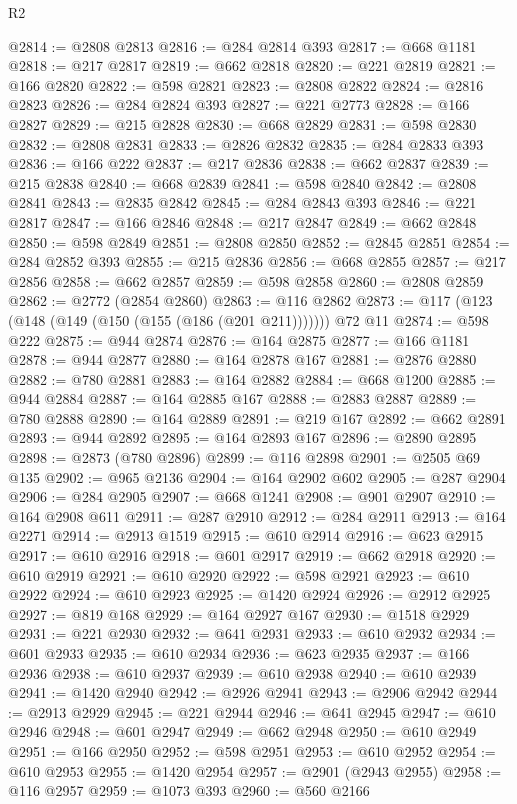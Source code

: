 \begin{lexlean}{R2}
\begin{coremodule}
@2814 := @2808 @2813
@2816 := @284 @2814 @393
@2817 := @668 @1181
@2818 := @217 @2817
@2819 := @662 @2818
@2820 := @221 @2819
@2821 := @166 @2820
@2822 := @598 @2821
@2823 := @2808 @2822
@2824 := @2816 @2823
@2826 := @284 @2824 @393
@2827 := @221 @2773
@2828 := @166 @2827
@2829 := @215 @2828
@2830 := @668 @2829
@2831 := @598 @2830
@2832 := @2808 @2831
@2833 := @2826 @2832
@2835 := @284 @2833 @393
@2836 := @166 @222
@2837 := @217 @2836
@2838 := @662 @2837
@2839 := @215 @2838
@2840 := @668 @2839
@2841 := @598 @2840
@2842 := @2808 @2841
@2843 := @2835 @2842
@2845 := @284 @2843 @393
@2846 := @221 @2817
@2847 := @166 @2846
@2848 := @217 @2847
@2849 := @662 @2848
@2850 := @598 @2849
@2851 := @2808 @2850
@2852 := @2845 @2851
@2854 := @284 @2852 @393
@2855 := @215 @2836
@2856 := @668 @2855
@2857 := @217 @2856
@2858 := @662 @2857
@2859 := @598 @2858
@2860 := @2808 @2859
@2862 := @2772 (@2854 @2860)
@2863 := @116 @2862
@2873 := @117 (@123 (@148 (@149 (@150 (@155 (@186 (@201 @211))))))) @72 @11
@2874 := @598 @222
@2875 := @944 @2874
@2876 := @164 @2875
@2877 := @166 @1181
@2878 := @944 @2877
@2880 := @164 @2878 @167
@2881 := @2876 @2880
@2882 := @780 @2881
@2883 := @164 @2882
@2884 := @668 @1200
@2885 := @944 @2884
@2887 := @164 @2885 @167
@2888 := @2883 @2887
@2889 := @780 @2888
@2890 := @164 @2889
@2891 := @219 @167
@2892 := @662 @2891
@2893 := @944 @2892
@2895 := @164 @2893 @167
@2896 := @2890 @2895
@2898 := @2873 (@780 @2896)
@2899 := @116 @2898
@2901 := @2505 @69 @135
@2902 := @965 @2136
@2904 := @164 @2902 @602
@2905 := @287 @2904
@2906 := @284 @2905
@2907 := @668 @1241
@2908 := @901 @2907
@2910 := @164 @2908 @611
@2911 := @287 @2910
@2912 := @284 @2911
@2913 := @164 @2271
@2914 := @2913 @1519
@2915 := @610 @2914
@2916 := @623 @2915
@2917 := @610 @2916
@2918 := @601 @2917
@2919 := @662 @2918
@2920 := @610 @2919
@2921 := @610 @2920
@2922 := @598 @2921
@2923 := @610 @2922
@2924 := @610 @2923
@2925 := @1420 @2924
@2926 := @2912 @2925
@2927 := @819 @168
@2929 := @164 @2927 @167
@2930 := @1518 @2929
@2931 := @221 @2930
@2932 := @641 @2931
@2933 := @610 @2932
@2934 := @601 @2933
@2935 := @610 @2934
@2936 := @623 @2935
@2937 := @166 @2936
@2938 := @610 @2937
@2939 := @610 @2938
@2940 := @610 @2939
@2941 := @1420 @2940
@2942 := @2926 @2941
@2943 := @2906 @2942
@2944 := @2913 @2929
@2945 := @221 @2944
@2946 := @641 @2945
@2947 := @610 @2946
@2948 := @601 @2947
@2949 := @662 @2948
@2950 := @610 @2949
@2951 := @166 @2950
@2952 := @598 @2951
@2953 := @610 @2952
@2954 := @610 @2953
@2955 := @1420 @2954
@2957 := @2901 (@2943 @2955)
@2958 := @116 @2957
@2959 := @1073 @393
@2960 := @560 @2166

\end{coremodule}
\end{lexlean}
